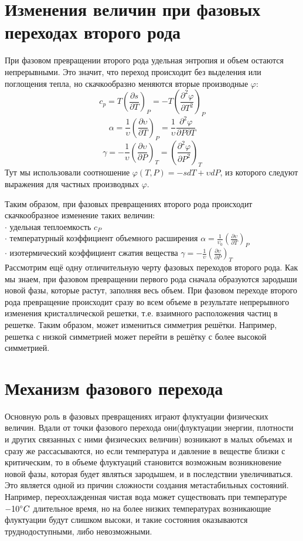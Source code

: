\documentclass[a4paper,12pt]{article}
\begin{document}
\section{Изменения величин при фазовых переходах второго рода}
При фазовом превращении второго рода удельная энтропия и объем остаются непрерывными. Это значит, что переход происходит без выделения или поглощения тепла, но скачкообразно меняются вторые производные $\varphi$:
$$ c_p = T\left(\frac{\partial s}{\partial T}\right)_P = -T\left( \frac{\partial^2 \varphi}{\partial T^2}\right)_P$$
$$\alpha = \frac{1}{\upsilon}\left(\frac{\partial \upsilon}{\partial T}\right)_P = \frac{1}{\upsilon} \frac{\partial^2 \varphi}{\partial P \partial T}$$
$$\gamma = - \frac{1}{\upsilon}\left(\frac{\partial \upsilon}{\partial P}\right)_T = \left(\frac{\partial^2 \varphi}{\partial P^2}\right)_T$$
Тут мы использовали соотношение $\varphi(T,P) = -sdT + \upsilon dP$, из которого следуют выражения для частных производных $\varphi$.

Таким образом, при фазовых превращениях второго рода происходит скачкообразное изменение таких величин: \\
$\cdot$ удельная теплоемкость $c_P$\\
$\cdot$ температурный коэффициент объемного расширения $\alpha = \frac{1}{\upsilon_0}\left(\frac{\partial \upsilon}{\partial T}\right)_P$\\
$\cdot$ изотермический коэффициент сжатия вещества $\gamma = - \frac{1}{\upsilon}\left(\frac{\partial \upsilon}{\partial P}\right)_T$ \\

Рассмотрим ещё одну отличительную черту фазовых переходов второго рода. Как мы знаем, при фазовом превращении первого рода сначала образуются зародыши новой фазы, которые растут, заполняя весь объем. При фазовом переходе второго рода превращение происходит сразу во всем объеме в результате непрерывного изменения кристаллической решетки, т.е. взаимного расположения частиц в решетке. Таким образом, может измениться симметрия решётки. Например, решетка с низкой симметрией может перейти в решётку с более высокой симметрией.	\\

\section{Механизм фазового перехода}
Основную роль в фазовых превращениях играют флуктуации физических величин. Вдали от точки фазового перехода они(флуктуации энергии, плотности и других связанных с ними физических величин) возникают в малых объемах и сразу же рассасываются, но если температура и давление в веществе близки с критическим, то в объеме флуктуаций становится возможным возникновение новой фазы, которая будет являться зародышем, и в последствии увеличиваться. Это является одной из причин сложности создания метастабильных состояний. Например, переохлажденная чистая вода может существовать при температуре $-10\degree C$ длительное время, но на более низких температурах возникающие флуктуации будут слишком высоки, и такие состояния оказываются труднодоступными, либо невозможными.\\
\end{document}
